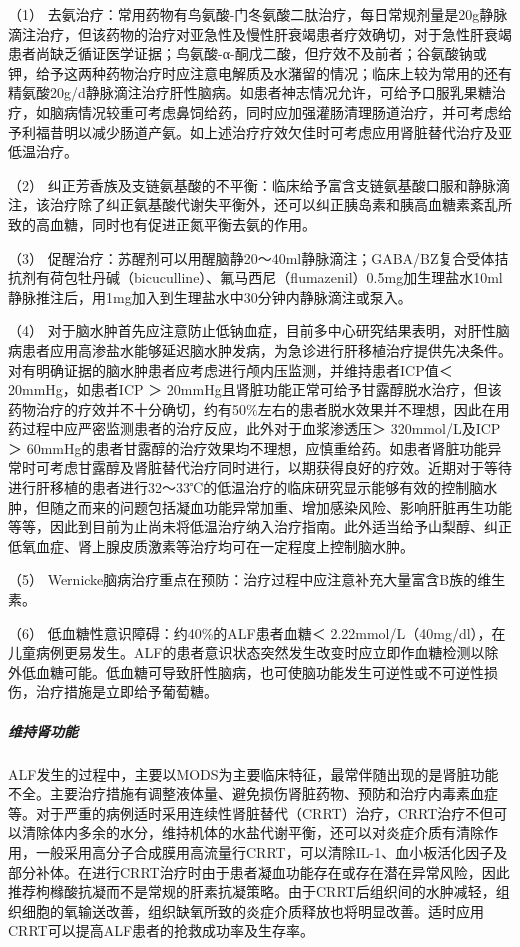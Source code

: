 （1）
去氨治疗：常用药物有鸟氨酸-门冬氨酸二肽治疗，每日常规剂量是20g静脉滴注治疗，但该药物的治疗对亚急性及慢性肝衰竭患者疗效确切，对于急性肝衰竭患者尚缺乏循证医学证据；鸟氨酸-α-酮戊二酸，但疗效不及前者；谷氨酸钠或钾，给予这两种药物治疗时应注意电解质及水潴留的情况；临床上较为常用的还有精氨酸20g/d静脉滴注治疗肝性脑病。如患者神志情况允许，可给予口服乳果糖治疗，如脑病情况较重可考虑鼻饲给药，同时应加强灌肠清理肠道治疗，并可考虑给予利福昔明以减少肠道产氨。如上述治疗疗效欠佳时可考虑应用肾脏替代治疗及亚低温治疗。

（2）
纠正芳香族及支链氨基酸的不平衡：临床给予富含支链氨基酸口服和静脉滴注，该治疗除了纠正氨基酸代谢失平衡外，还可以纠正胰岛素和胰高血糖素紊乱所致的高血糖，同时也有促进正氮平衡去氨的作用。

（3）
促醒治疗：苏醒剂可以用醒脑静20～40ml静脉滴注；GABA/BZ复合受体拮抗剂有荷包牡丹碱（bicuculline）、氟马西尼（flumazenil）0.5mg加生理盐水10ml静脉推注后，用1mg加入到生理盐水中30分钟内静脉滴注或泵入。

（4）
对于脑水肿首先应注意防止低钠血症，目前多中心研究结果表明，对肝性脑病患者应用高渗盐水能够延迟脑水肿发病，为急诊进行肝移植治疗提供先决条件。对有明确证据的脑水肿患者应考虑进行颅内压监测，并维持患者ICP值＜
20mmHg，如患者ICP ＞
20mmHg且肾脏功能正常可给予甘露醇脱水治疗，但该药物治疗的疗效并不十分确切，约有50\%左右的患者脱水效果并不理想，因此在用药过程中应严密监测患者的治疗反应，此外对于血浆渗透压＞
320mmol/L及ICP ＞
60mmHg的患者甘露醇的治疗效果均不理想，应慎重给药。如患者肾脏功能异常时可考虑甘露醇及肾脏替代治疗同时进行，以期获得良好的疗效。近期对于等待进行肝移植的患者进行32～33℃的低温治疗的临床研究显示能够有效的控制脑水肿，但随之而来的问题包括凝血功能异常加重、增加感染风险、影响肝脏再生功能等等，因此到目前为止尚未将低温治疗纳入治疗指南。此外适当给予山梨醇、纠正低氧血症、肾上腺皮质激素等治疗均可在一定程度上控制脑水肿。

（5）
Wernicke脑病治疗重点在预防：治疗过程中应注意补充大量富含B族的维生素。

（6） 低血糖性意识障碍：约40\%的ALF患者血糖＜
2.22mmol/L（40mg/dl），在儿童病例更易发生。ALF的患者意识状态突然发生改变时应立即作血糖检测以除外低血糖可能。低血糖可导致肝性脑病，也可使脑功能发生可逆性或不可逆性损伤，治疗措施是立即给予葡萄糖。

\subparagraph{维持肾功能}

ALF发生的过程中，主要以MODS为主要临床特征，最常伴随出现的是肾脏功能不全。主要治疗措施有调整液体量、避免损伤肾脏药物、预防和治疗内毒素血症等。对于严重的病例适时采用连续性肾脏替代（CRRT）治疗，CRRT治疗不但可以清除体内多余的水分，维持机体的水盐代谢平衡，还可以对炎症介质有清除作用，一般采用高分子合成膜用高流量行CRRT，可以清除IL-1、血小板活化因子及部分补体。在进行CRRT治疗时由于患者凝血功能存在或存在潜在异常风险，因此推荐枸橼酸抗凝而不是常规的肝素抗凝策略。由于CRRT后组织间的水肿减轻，组织细胞的氧输送改善，组织缺氧所致的炎症介质释放也将明显改善。适时应用CRRT可以提高ALF患者的抢救成功率及生存率。


